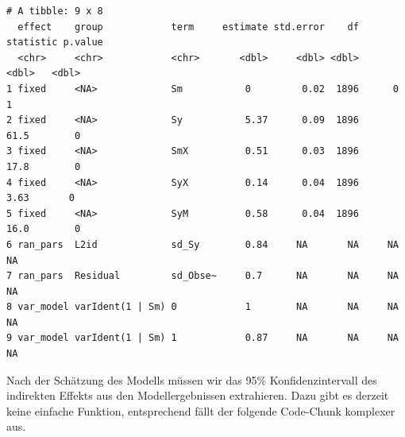 \documentclass[
  letterpaper,
  DIV=11,
  numbers=noendperiod]{scrreprt}
\newenvironment{Shaded}{\begin{snugshade}}{\end{snugshade}}
\newcommand{\CommentTok}[1]{\textcolor[rgb]{0.37,0.37,0.37}{#1}}
\newcommand{\DecValTok}[1]{\textcolor[rgb]{0.68,0.00,0.00}{#1}}
\newcommand{\FunctionTok}[1]{\textcolor[rgb]{0.28,0.35,0.67}{#1}}
\newcommand{\NormalTok}[1]{\textcolor[rgb]{0.00,0.23,0.31}{#1}}
\newcommand{\SpecialCharTok}[1]{\textcolor[rgb]{0.37,0.37,0.37}{#1}}
\begin{document}
\begin{Shaded}
\end{Shaded}

\begin{verbatim}
# A tibble: 9 x 8
  effect    group            term     estimate std.error    df statistic p.value
  <chr>     <chr>            <chr>       <dbl>     <dbl> <dbl>     <dbl>   <dbl>
1 fixed     <NA>             Sm           0         0.02  1896      0          1
2 fixed     <NA>             Sy           5.37      0.09  1896     61.5        0
3 fixed     <NA>             SmX          0.51      0.03  1896     17.8        0
4 fixed     <NA>             SyX          0.14      0.04  1896      3.63       0
5 fixed     <NA>             SyM          0.58      0.04  1896     16.0        0
6 ran_pars  L2id             sd_Sy        0.84     NA       NA     NA         NA
7 ran_pars  Residual         sd_Obse~     0.7      NA       NA     NA         NA
8 var_model varIdent(1 | Sm) 0            1        NA       NA     NA         NA
9 var_model varIdent(1 | Sm) 1            0.87     NA       NA     NA         NA
\end{verbatim}

Nach der Schätzung des Modells müssen wir das 95\% Konfidenzintervall
des indirekten Effekts aus den Modellergebnissen extrahieren. Dazu gibt
es derzeit keine einfache Funktion, entsprechend fällt der folgende
Code-Chunk komplexer aus.
\end{document}
